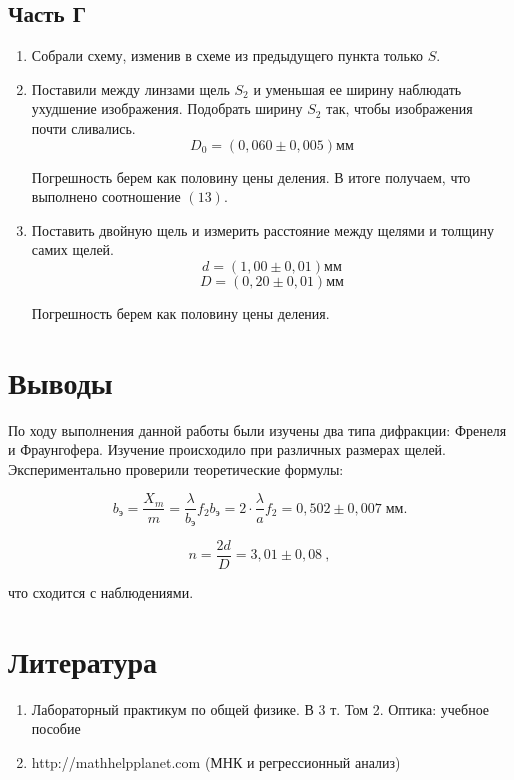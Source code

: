 \documentclass[a4paper, 12pt]{article}%
\begin{document}
\subsection{Часть Г}
\begin{enumerate}
\item Собрали схему, изменив в схеме из предыдущего пункта только $S$.
\item Поставили между линзами щель $S_2$ и уменьшая ее ширину наблюдать ухудшение изображения. Подобрать ширину $S_2$ так, чтобы изображения почти сливались.
\[D_0 = (0,060 \pm 0,005)\text{мм}\]


Погрешность берем как половину цены деления.
В итоге получаем, что выполнено соотношение $(13)$.
\item Поставить двойную щель и измерить расстояние между щелями и толщину самих щелей.
\[d = (1,00 \pm 0,01) \text{мм}\]
\[D = (0,20 \pm 0,01) \text{мм}\]

Погрешность берем как половину цены деления.
\end{enumerate}

\section{Выводы}

По ходу выполнения данной работы были изучены два типа дифракции: Френеля и Фраунгофера.
Изучение происходило при различных размерах щелей. Экспериментально проверили теоретические формулы:

\begin{equation}
b_{\text{э}}= \frac{X_m}{m} = \dfrac{\lambda}{b_{\text{э}}} f_2 b_{\text{э}} = 2 \cdot \dfrac{\lambda}{a} f_2 = 0,502 \pm 0,007 \; мм.
\end{equation}

\begin{equation}
n = \frac{2d}{D} = 3,01 \pm 0,08\ ,
\end{equation}

что сходится с наблюдениями.

\section{Литература}

\begin{enumerate}

\item Лабораторный практикум по общей физике. В 3 т. Том 2. Оптика: учебное пособие

\item http://mathhelpplanet.com (МНК и регрессионный анализ)


\end{enumerate}	
\end{document}
